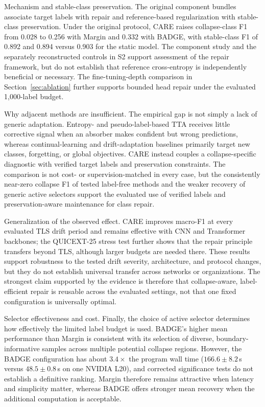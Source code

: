 \documentclass[preprint,12pt,authoryear]{elsarticle}
\newcommand{\ours}{CARE}  %
\begin{document}
Mechanism and stable-class preservation.
The original component bundles associate target labels with repair and reference-based regularization with stable-class preservation. Under the original protocol, CARE raises collapse-class F1 from 0.028 to 0.256 with Margin and 0.332 with BADGE, with stable-class F1 of 0.892 and 0.894 versus 0.903 for the static model. The component study and the separately reconstructed controls in S2 support assessment of the repair framework, but do not establish that reference cross-entropy is independently beneficial or necessary. The fine-tuning-depth comparison in Section~\ref{sec:ablation} further supports bounded head repair under the evaluated 1{,}000-label budget.

Why adjacent methods are insufficient.
The empirical gap is not simply a lack of generic adaptation. Entropy- and pseudo-label-based TTA receives little corrective signal when an absorber makes confident but wrong predictions, whereas continual-learning and drift-adaptation baselines primarily target new classes, forgetting, or global objectives. \ours{} instead couples a collapse-specific diagnostic with verified target labels and preservation constraints. The comparison is not cost- or supervision-matched in every case, but the consistently near-zero collapse F1 of tested label-free methods and the weaker recovery of generic active selectors support the evaluated use of verified labels and preservation-aware maintenance for class repair.

Generalization of the observed effect.
\ours{} improves macro-F1 at every evaluated TLS drift period and remains effective with CNN and Transformer backbones; the QUICEXT-25 stress test further shows that the repair principle transfers beyond TLS, although larger budgets are needed there. These results support robustness to the tested drift severity, architecture, and protocol changes, but they do not establish universal transfer across networks or organizations. The strongest claim supported by the evidence is therefore that collapse-aware, label-efficient repair is reusable across the evaluated settings, not that one fixed configuration is universally optimal.

Selector effectiveness and cost.
Finally, the choice of active selector determines how effectively the limited label budget is used. BADGE's higher mean performance than Margin is consistent with its selection of diverse, boundary-informative samples across multiple potential collapse regions. However, the BADGE configuration has about $3.4{\times}$ the program wall time ($166.6{\pm}8.2$\,s versus $48.5{\pm}0.8$\,s on one NVIDIA L20), and corrected significance tests do not establish a definitive ranking. Margin therefore remains attractive when latency and simplicity matter, whereas BADGE offers stronger mean recovery when the additional computation is acceptable.
\end{document}
